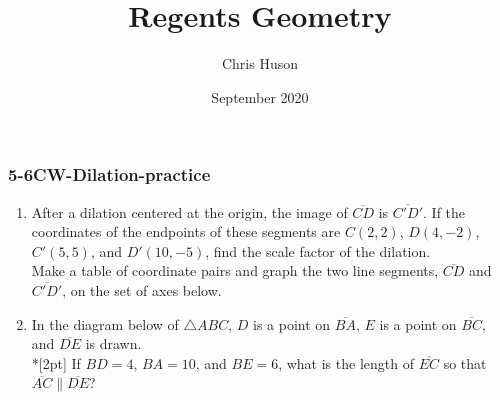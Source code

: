\documentclass[12pt, twoside]{article}
\title{Regents Geometry}
\author{Chris Huson}
\date{September 2020}
\begin{document}
\subsubsection*{5-6CW-Dilation-practice}
\begin{enumerate}
\item After a dilation centered at the origin, the image of $\overline{CD}$ is $\overline{C'D'}$. If the coordinates of the endpoints of these segments are $C(2,2)$, $D(4,-2)$, $C'(5,5)$, and $D'(10,-5)$, find the scale factor of the dilation.\\[0.25cm]
Make a table of coordinate pairs and graph the two line segments,  $\overline{CD}$ and  $\overline{C'D'}$, on the set of axes below.
  \begin{flushright}
  \end{flushright}


\item In the diagram below of $\triangle ABC$, $D$ is a point on $\overline{BA}$, $E$ is a point on $\overline{BC}$, and $\overline{DE}$ is drawn. \\*[2pt] 
 If $BD=4$, $BA=10$, and $BE=6$, what is the length of $\overline{EC}$ so that $\overline{AC} \parallel \overline{DE}$?
 
 \begin{flushright}
   \end{flushright}


\newpage


\end{enumerate}
\end{document}
